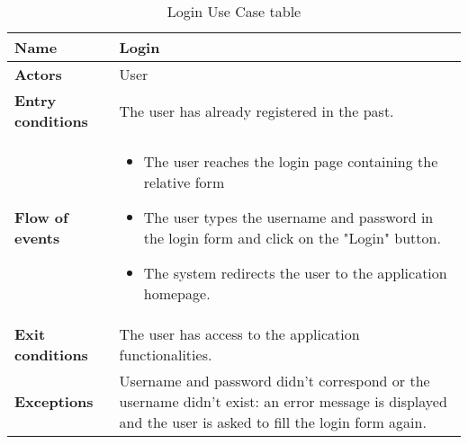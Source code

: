 \begin{table}[!htbp]
\centering
\begin{tabular}{lp{8cm}}
\bf\large Name&\bf\large Login\\
\hline
\hline
\bf Actors&User\\
\hline
\bf Entry conditions&The user has already registered in the past.\\
\hline
\bf Flow of events&
\begin{itemize}
\item The user reaches the login page containing the relative form
\item The user types the username and password in the login form and click on the "Login" button.
\item The system redirects the user to the application homepage.
\end{itemize}
\\
\hline
\bf Exit conditions&The user has access to the application functionalities. \\
\hline
\bf Exceptions&Username and password didn't correspond or the username didn't exist: an error message is displayed and the user is asked to fill the login form again.\\
\hline

\end{tabular}

\caption{Login Use Case table} \label{tab:login}
\end{table}